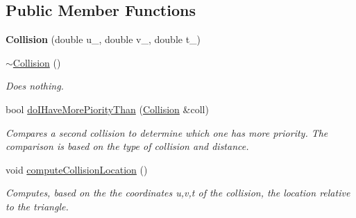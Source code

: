 \subsection*{Public Member Functions}
\begin{DoxyCompactItemize}
\item 
\mbox{\label{class_collision_a4cd23239c1de38dcc082345934a34441}} 
{\bfseries Collision} (double u\+\_\+, double v\+\_\+, double t\+\_\+)
\item 
\mbox{\label{class_collision_a19ae49bcb3b16f4622443a34a171590c}} 
\hyperlink{class_collision_a19ae49bcb3b16f4622443a34a171590c}{$\sim$\+Collision} ()
\begin{DoxyCompactList}\small\item\em Does nothing. \end{DoxyCompactList}\item 
\mbox{\label{class_collision_aedabfa9b114e4201343963df5698f7ef}} 
bool \hyperlink{class_collision_aedabfa9b114e4201343963df5698f7ef}{do\+I\+Have\+More\+Piority\+Than} (\hyperlink{class_collision}{Collision} \&coll)
\begin{DoxyCompactList}\small\item\em Compares a second collision to determine which one has more priority. The comparison is based on the type of collision and distance. \end{DoxyCompactList}\item 
void \hyperlink{class_collision_aa7ec5170357d8913c390defd844686e1}{compute\+Collision\+Location} ()
\begin{DoxyCompactList}\small\item\em Computes, based on the the coordinates u,v,t of the collision, the location relative to the triangle. \end{DoxyCompactList}\end{DoxyCompactItemize}

